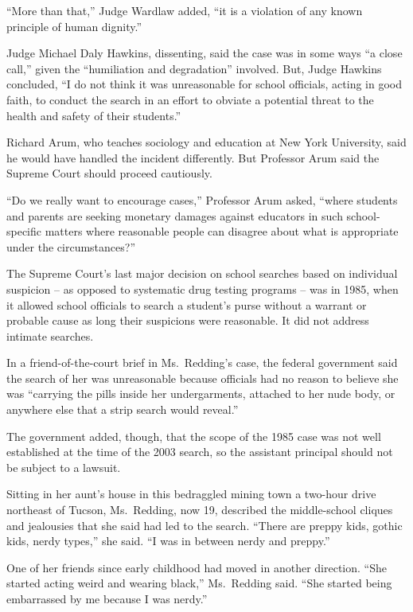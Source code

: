 \documentclass[12pt,a4paper,onecolumn]{article}
\begin{document}
\begin{CJK*}{GBK}{song}
``More than that,'' Judge Wardlaw added, ``it is a violation of any known principle of human
dignity.''

Judge Michael Daly Hawkins, dissenting, said the case was in some ways ``a close call,'' given the
``humiliation and degradation'' involved. But, Judge Hawkins concluded, ``I do not think it was
unreasonable for school officials, acting in good faith, to conduct the search in an effort to
obviate a potential threat to the health and safety of their students.''

Richard Arum, who teaches sociology and education at New York University, said he would have handled
the incident differently. But Professor Arum said the Supreme Court should proceed cautiously.

``Do we really want to encourage cases,'' Professor Arum asked, ``where students and parents are
seeking monetary damages against educators in such school-specific matters where reasonable people
can disagree about what is appropriate under the circumstances?''

The Supreme Court's last major decision on school searches based on individual suspicion -- as
opposed to systematic drug testing programs -- was in 1985, when it allowed school officials to
search a student's purse without a warrant or probable cause as long their suspicions were
reasonable. It did not address intimate searches.

In a friend-of-the-court brief in Ms.~Redding's case, the federal government said the search of her
was unreasonable because officials had no reason to believe she was ``carrying the pills inside her
undergarments, attached to her nude body, or anywhere else that a strip search would reveal.''

The government added, though, that the scope of the 1985 case was not well established at the time
of the 2003 search, so the assistant principal should not be subject to a lawsuit.

Sitting in her aunt's house in this bedraggled mining town a two-hour drive northeast of Tucson,
Ms.~Redding, now 19, described the middle-school cliques and jealousies that she said had led to the
search. ``There are preppy kids, gothic kids, nerdy types,'' she said. ``I was in between nerdy and
preppy.''

One of her friends since early childhood had moved in another direction. ``She started acting weird
and wearing black,'' Ms.~Redding said. ``She started being embarrassed by me because I was nerdy.''


\end{CJK*}
\end{document}
